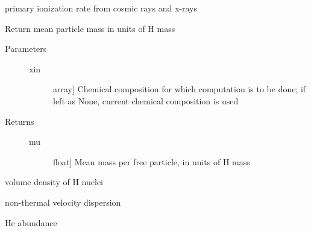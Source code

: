 \documentclass[letterpaper,10pt,english]{sphinxmanual}
\begin{document}
\begin{fulllineitems}

\begin{fulllineitems}
\label{fulldoc:despotic.chemistry.NL99_GC.ionRate}
primary ionization rate from cosmic rays and x-rays

\end{fulllineitems}


\begin{fulllineitems}
\label{fulldoc:despotic.chemistry.NL99_GC.mu}
Return mean particle mass in units of H mass
\begin{description}
\item[{Parameters}] \leavevmode\begin{description}
\item[{xin}] \leavevmode{[}array{]}
Chemical composition for which computation is to be
done; if left as None, current chemical composition is
used

\end{description}

\item[{Returns}] \leavevmode\begin{description}
\item[{mu}] \leavevmode{[}float{]}
Mean mass per free particle, in units of H mass

\end{description}

\end{description}

\end{fulllineitems}


\begin{fulllineitems}
\label{fulldoc:despotic.chemistry.NL99_GC.nH}
volume density of H nuclei

\end{fulllineitems}


\begin{fulllineitems}
\label{fulldoc:despotic.chemistry.NL99_GC.sigmaNT}
non-thermal velocity dispersion

\end{fulllineitems}


\begin{fulllineitems}
\label{fulldoc:despotic.chemistry.NL99_GC.xHe}
He abundance

\end{fulllineitems}


\end{fulllineitems}
\end{document}
